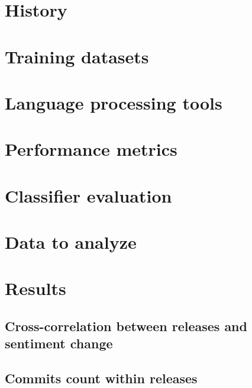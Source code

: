 \section{History}


\section{Training datasets}


\section{Language processing tools}


\section{Performance metrics}


\section{Classifier evaluation}


\section{Data to analyze}


\section{Results}



\subsection{Cross-correlation between releases and sentiment change}


\subsection{Commits count within releases} \label{ssec:crossCorrelationCommits}
 
